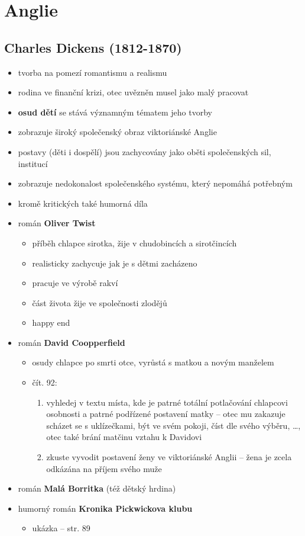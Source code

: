 \section{Anglie}
\subsection{Charles Dickens (1812-1870)}
\begin{itemize}
\item tvorba na pomezí romantismu a realismu
\item rodina ve finanční krizi, otec uvězněn \ra musel jako malý pracovat
\item \textbf{osud dětí} se stává významným tématem jeho tvorby
\item zobrazuje široký společenský obraz viktoriánské Anglie
\item postavy (děti i dospělí) jsou zachycovány jako oběti společenských sil, institucí
\item zobrazuje nedokonalost společenského systému, který nepomáhá potřebným
\item kromě kritických také humorná díla
\item román \textbf{Oliver Twist}
	\begin{itemize}
	\item příběh chlapce sirotka, žije v chudobincích a sirotčincích
	\item realisticky zachycuje jak je s dětmi zacházeno
	\item pracuje ve výrobě rakví
	\item část života žije ve společnosti zlodějů
	\item happy end
	\end{itemize}
\item román \textbf{David Coopperfield}
	\begin{itemize}
	\item osudy chlapce po smrti otce, vyrůstá s matkou a novým manželem
	\item čít. 92:
		\begin{enumerate}
		\item vyhledej v textu místa, kde je patrné totální potlačování chlapcovi osobnosti a patrné podřízené postavení matky -- otec mu zakazuje scházet se s uklízečkami, být ve svém pokoji, číst dle svého výběru, \ldots, otec také brání matčinu vztahu k Davidovi
		\item zkuste vyvodit postavení ženy ve viktoriánské Anglii -- žena je zcela odkázána na příjem svého muže
		\end{enumerate}
	\end{itemize}
\item román \textbf{Malá Borritka} (též dětský hrdina)
\item humorný román \textbf{Kronika Pickwickova klubu}
	\begin{itemize}
	\item ukázka -- str. 89
	\end{itemize}
\end{itemize}

